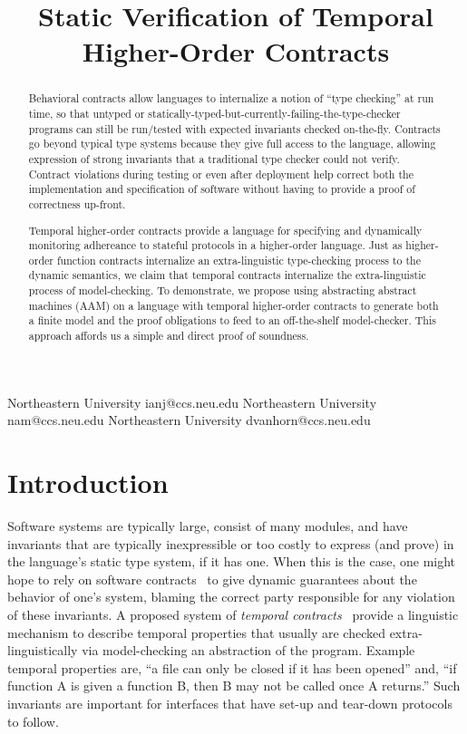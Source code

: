 \documentclass[preprint,onecolumn,9pt]{sigplanconf} %
\begin{document}
\copyrightdata{[to be supplied]}
\title{Static Verification of Temporal Higher-Order Contracts}

           {Northeastern University}
           {ianj@ccs.neu.edu}
           {Northeastern University}
           {nam@ccs.neu.edu}
           {Northeastern University}
           {dvanhorn@ccs.neu.edu}
\maketitle
\begin{abstract}
  Behavioral contracts allow languages to internalize a notion of ``type checking'' at run time, so that untyped or statically-typed-but-currently-failing-the-type-checker programs can still be run/tested with expected invariants checked on-the-fly.
%
  Contracts go beyond typical type systems because they give full access to the language, allowing expression of strong invariants that a traditional type checker could not verify.
%
  Contract violations during testing or even after deployment help correct both the implementation and specification of software without having to provide a proof of correctness up-front.

  Temporal higher-order contracts provide a language for specifying and dynamically monitoring adhereance to stateful protocols in a higher-order language.
%
  Just as higher-order function contracts internalize an extra-linguistic type-checking process to the dynamic semantics, we claim that temporal contracts internalize the extra-linguistic process of model-checking.
%
  To demonstrate, we propose using abstracting abstract machines (AAM) on a language with temporal higher-order contracts to generate both a finite model and the proof obligations to feed to an off-the-shelf model-checker.
%
  This approach affords us a simple and direct proof of soundness.
\end{abstract}

\section{Introduction}

Software systems are typically large, consist of many modules, and have invariants that are typically inexpressible or too costly to express (and prove) in the language's static type system, if it has one.
%
When this is the case, one might hope to rely on software contracts~\cite{dvanhorn:Findler2002Contracts} to give dynamic guarantees about the behavior of one's system, blaming the correct party responsible for any violation of these invariants.
%
A proposed system of \emph{temporal contracts}~\citep{ianjohnson:dfm:icfp2011} provide a linguistic mechanism to describe temporal properties that usually are checked extra-linguistically via model-checking an abstraction of the program.
%
Example temporal properties are, ``a file can only be closed if it has been opened'' and, ``if function A is given a function B, then B may not be called once A returns.''
%
Such invariants are important for interfaces that have set-up and tear-down protocols to follow.
\end{document}
